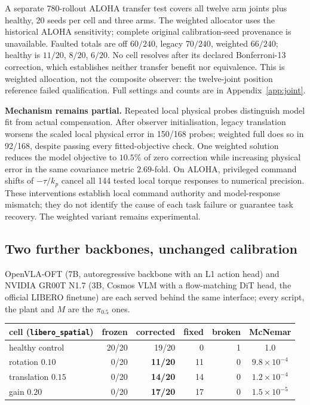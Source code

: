 \documentclass{article}
\newcommand{\code}[1]{\texttt{\small #1}}
\begin{document}
A separate 780-rollout ALOHA transfer test covers all twelve arm joints plus healthy,
20 seeds per cell and three arms. The weighted allocator uses the historical ALOHA
sensitivity; complete original calibration-seed provenance is unavailable. Faulted totals
are off $60/240$, legacy $70/240$, weighted $66/240$; healthy is $11/20$, $8/20$, $6/20$.
No cell resolves after its declared Bonferroni-13 correction, which establishes neither
transfer benefit nor equivalence. This is weighted allocation, not the composite observer:
the twelve-joint position reference failed qualification. Full settings and counts are in
Appendix~\ref{app:joint}.

\textbf{Mechanism remains partial.} Repeated local physical probes distinguish model fit
from actual compensation. After observer initialisation, legacy translation worsens the
scaled local physical error in 150/168 probes; weighted full does so in 92/168, despite
passing every fitted-objective check. One weighted solution reduces the model objective
to $10.5\%$ of zero correction while increasing physical error in the same covariance
metric $2.69$-fold. On ALOHA, privileged command shifts of $-\tau/k_p$ cancel all 144 tested
local torque responses to numerical precision. These interventions establish local command
authority and model-response mismatch; they do not identify the cause of each task failure
or guarantee task recovery. The weighted variant remains experimental.

\subsection{Two further backbones, unchanged calibration}
\label{sec:oft}

OpenVLA-OFT (7B, autoregressive backbone with an L1 action head) and NVIDIA GR00T N1.7
(3B, Cosmos VLM with a flow-matching DiT head, the official LIBERO finetune) are each
served behind the same interface; every script, the plant and $M$ are the $\pi_{0.5}$ ones.

\begin{center}\small
\begin{tabular}{lrrrrc}
\toprule
cell (\code{libero\_spatial}) & frozen & corrected & fixed & broken & McNemar \\
\midrule
healthy control & 20/20 & 19/20 & 0 & 1 & 1.0 \\
rotation $0.10$ & 0/20 & \textbf{11/20} & 11 & 0 & $9.8\times10^{-4}$ \\
translation $0.15$ & 0/20 & \textbf{14/20} & 14 & 0 & $1.2\times10^{-4}$ \\
gain $0.20$ & 0/20 & \textbf{17/20} & 17 & 0 & $1.5\times10^{-5}$ \\
\bottomrule
\end{tabular}
\end{center}
\end{document}
